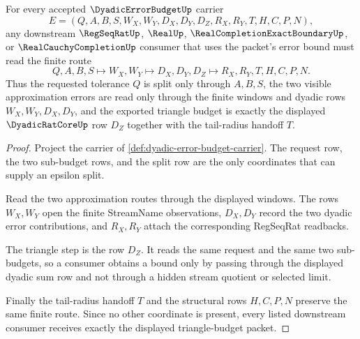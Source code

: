 \begin{theorem}
\label{thm:dyadic-error-budget-triangle-accounting}
For every accepted $\DyadicErrorBudgetUp$ carrier
$$
E=(Q,A,B,S,W_X,W_Y,D_X,D_Y,D_Z,R_X,R_Y,T,H,C,P,N),
$$
any downstream $\RegSeqRatUp$, $\RealUp$, $\RealCompletionExactBoundaryUp$, or $\RealCauchyCompletionUp$ consumer that uses the packet's error bound must read the finite route
$$
Q,A,B,S \longmapsto W_X,W_Y \longmapsto D_X,D_Y,D_Z \longmapsto R_X,R_Y,T,H,C,P,N .
$$
Thus the requested tolerance $Q$ is split only through $A,B,S$, the two visible approximation errors are read only through the finite windows and dyadic rows $W_X,W_Y,D_X,D_Y$, and the exported triangle budget is exactly the displayed $\DyadicRatCoreUp$ row $D_Z$ together with the tail-radius handoff $T$.
\end{theorem}
\begin{proof}
Project the carrier of \autoref{def:dyadic-error-budget-carrier}. The request row, the two sub-budget rows, and the split row are the only coordinates that can supply an epsilon split.

Read the two approximation routes through the displayed windows. The rows $W_X,W_Y$ open the finite StreamName observations, $D_X,D_Y$ record the two dyadic error contributions, and $R_X,R_Y$ attach the corresponding RegSeqRat readbacks.

The triangle step is the row $D_Z$. It reads the same request and the same two sub-budgets, so a consumer obtains a bound only by passing through the displayed dyadic sum row and not through a hidden stream quotient or selected limit.

Finally the tail-radius handoff $T$ and the structural rows $H,C,P,N$ preserve the same finite route. Since no other coordinate is present, every listed downstream consumer receives exactly the displayed triangle-budget packet.
\end{proof}


